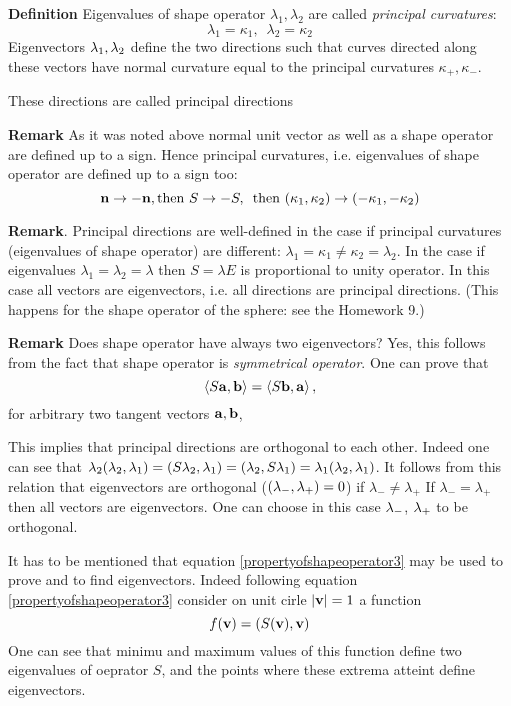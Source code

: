 \documentclass[12pt]{article}
\theoremstyle{theorem}
\numberwithin{equation}{section}
\begin{document}
{\m

\def\k {{\kappa}}

{\bf Definition} Eigenvalues of shape operator $\lambda_1,\lambda_2$ are called {\it principal curvatures}:
             $$
   \lambda_1=\k_1,\,\,\,\lambda_2=\k_2
              $$
 Eigenvectors $\lambda_1,\lambda_2$ define the two directions such that  curves directed along
  these vectors have normal curvature equal to the principal curvatures $\k_+, \k_-$.

These directions are called principal directions

\m



{\bf Remark} As it was noted above normal unit vector as well as a shape operator are defined up to a sign.
Hence principal curvatures, i.e. eigenvalues of shape operator are defined up to a sign too:
                \begin{equation}\label{princcurvaturearedefinedup to asign}
\n\to -\n, {\rm then}\,\, S\to -S, \,\,\,{\rm then}\,\, (\k_1,\k_2)\to (-\k_1,-\k_2)
                \end{equation}

{\footnotesize
{\bf Remark}. Principal directions are well-defined in the case if principal curvatures (eigenvalues of shape operator)
are different: $\lambda_1=\kappa_1\not=\kappa_2=\lambda_2$.
 In the case if eigenvalues $\lambda_1=\lambda_2=\lambda$ then $S=\lambda E$ is proportional to unity operator.
 In this case  all vectors
are eigenvectors, i.e. all directions are principal directions.
(This happens for the shape operator of the sphere: see the Homework 9.)



{\bf Remark}
Does shape operator have always two eigenvectors? 
Yes, this follows from the fact that shape operator is 
{\it symmetrical operator}. One can prove that
                $$
\langle S{\bf a}, {\bf b}\rangle=\langle S{\bf b}, {\bf a}\rangle\,,
              $$ for arbitrary two tangent vectors ${\bf a},{\bf b}$,

  This implies that principal directions are orthogonal to each other.
 Indeed one can see that
             $\lambda_2(\lambda_2,\lambda_1)=(S\lambda_2,\lambda_1)=(\lambda_2,S\lambda_1)=\lambda_1(\lambda_2,\lambda_1)$.
It follows from this relation that eigenvectors are orthogonal ($(\lambda_-,\lambda_+)=0$) if $\lambda_-\not=\lambda_+$
If $\lambda_-=\lambda_+$ then all vectors are eigenvectors. 
One can choose in this case
$\lambda_-$, $\lambda_+$ to be orthogonal.

It has to be mentioned that equation \eqref{propertyofshapeoperator3}
may be used to prove and to find eigenvectors. Indeed following equation
\eqref{propertyofshapeoperator3} consider on unit cirle $|{\bf v}|=1$ a function
           $$
   f({\bf v})=(S({\bf v}),{\bf v})
               $$
One can see that minimu and maximum values of this function
define two eigenvalues of oeprator $S$, and the points
where these extrema atteint define eigenvectors.
}

}
\end{document}
